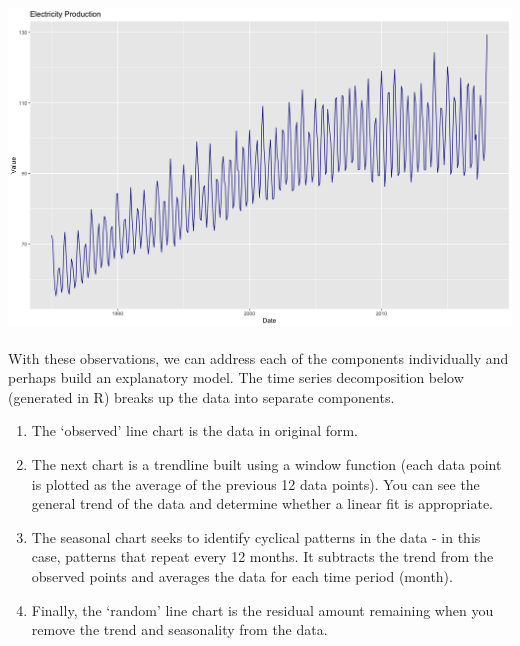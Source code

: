 \documentclass[
]{article}
\providecommand{\tightlist}{%
  \setlength{\itemsep}{0pt}\setlength{\parskip}{0pt}}
\begin{document}
\hypertarget{im_06_07}{%
\subsubsection{\texorpdfstring{\protect\includegraphics{./im/im_06_01.png}}{im\_06\_07}}\label{im_06_07}}

With these observations, we can address each of the components individually and perhaps build an explanatory model. The time series decomposition below (generated in R) breaks up the data into separate components.

\begin{enumerate}
\def\labelenumi{\arabic{enumi}.}
\tightlist
\item
  The `observed' line chart is the data in original form.
\item
  The next chart is a trendline built using a window function (each data point is plotted as the average of the previous 12 data points). You can see the general trend of the data and determine whether a linear fit is appropriate.
\item
  The seasonal chart seeks to identify cyclical patterns in the data - in this case, patterns that repeat every 12 months. It subtracts the trend from the observed points and averages the data for each time period (month).\\
\item
  Finally, the `random' line chart is the residual amount remaining when you remove the trend and seasonality from the data.
\end{enumerate}
\end{document}
